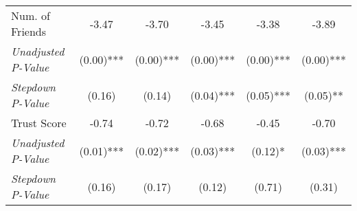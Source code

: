 \begin{tabular}{l c c c c c}
Num. of Friends & -3.47 & -3.70 & -3.45 & -3.38 & -3.89 \\
\quad \textit{Unadjusted P-Value} & (0.00)*** & (0.00)*** & (0.00)*** & (0.00)*** & (0.00)*** \\
\quad \textit{Stepdown P-Value} & (0.16) & (0.14) & (0.04)*** & (0.05)*** & (0.05)** \\
Trust Score & -0.74 & -0.72 & -0.68 & -0.45 & -0.70 \\
\quad \textit{Unadjusted P-Value} & (0.01)*** & (0.02)*** & (0.03)*** & (0.12)* & (0.03)*** \\
\quad \textit{Stepdown P-Value} & (0.16) & (0.17) & (0.12) & (0.71) & (0.31) \\
\bottomrule
\end{tabular}
